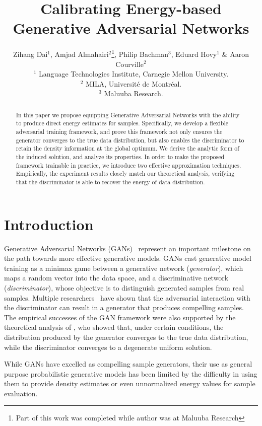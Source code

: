 \documentclass[a4paper]{article}
\title{Calibrating Energy-based Generative Adversarial Networks}
\author{
	Zihang Dai$^1$, Amjad Almahairi$^2$\thanks{Part of this work was completed while author was at Maluuba Research}, Philip Bachman$^3$, Eduard Hovy$^1$ \& Aaron Courville$^2$\\
    $^1$ Language Technologies Institute, Carnegie Mellon University.\\
    $^2$ MILA,  Universit\'e de Montr\'eal.\\
    $^3$ Maluuba Research.
}
\begin{document}
\maketitle
	
\begin{abstract}
In this paper we propose equipping Generative Adversarial Networks with the ability to produce direct energy estimates for samples.
Specifically, we develop a flexible adversarial training framework, and prove this framework not only ensures the generator converges to the true data distribution, but also enables the discriminator to retain the density information at the global optimum.
We derive the analytic form of the induced solution, and analyze its properties.
In order to make the proposed framework trainable in practice, we introduce two effective approximation techniques.
Empirically, the experiment results closely match our theoretical analysis, verifying that the discriminator is able to recover the energy of data distribution.
\end{abstract}

\section{Introduction}
\label{sec:introduction}

Generative Adversarial Networks (GANs)~\citep{goodfellow2014generative} represent an important milestone on the path towards more effective generative models.
GANs cast generative model training as a minimax game between a generative network (\emph{generator}), which maps a random vector into the data space, and a discriminative network (\emph{discriminator}), whose objective is to distinguish generated samples from real samples. Multiple researchers~\cite{radford2015unsupervised,salimans2016improved,zhao2016energy} have shown that the adversarial interaction with the discriminator can result in a generator that produces compelling samples. 
The empirical successes of the GAN framework were also supported by the theoretical analysis of \citeauthor{goodfellow2014generative}, who showed that,
under certain conditions, the distribution produced by the generator converges to the true data distribution, while
the discriminator converges to a degenerate uniform solution.




While GANs have excelled as compelling sample generators, their use as general purpose probabilistic generative models has been limited by the difficulty in using them to provide density estimates or even unnormalized energy values for sample evaluation. 
\end{document}
